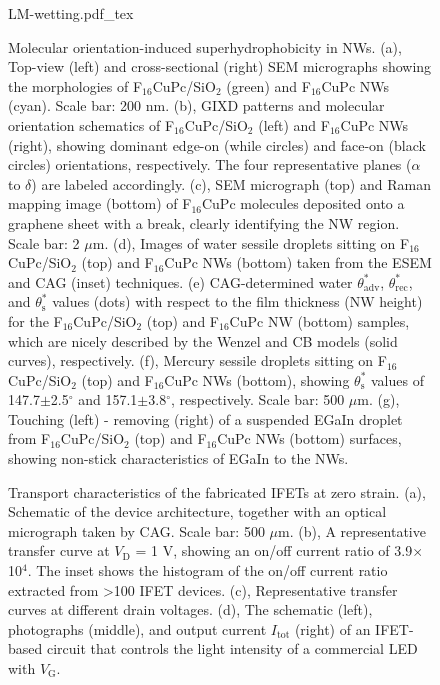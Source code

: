 \begin{figure}[htbp]
  \centering
  {LM-wetting.pdf_tex}
\caption{\label{fig:small-lm-wet} 
Molecular orientation-induced superhydrophobicity in NWs. (a), Top-view (left) and cross-sectional (right) SEM micrographs showing the morphologies of F\(_{\text{16}}\)CuPc/SiO\(_{\text{2}}\) (green) and F\(_{\text{16}}\)CuPc NWs (cyan). Scale bar: 200 nm. (b), GIXD patterns and molecular orientation schematics of F\(_{\text{16}}\)CuPc/SiO\(_{\text{2}}\) (left) and F\(_{\text{16}}\)CuPc NWs (right), showing dominant edge-on (while circles) and face-on (black circles) orientations, respectively. The four representative planes (\(\alpha\) to \(\delta\)) are labeled accordingly. (c), SEM micrograph (top) and Raman mapping image (bottom) of F\(_{\text{16}}\)CuPc molecules deposited onto a graphene sheet with a break, clearly identifying the NW region. Scale bar: 2 \(\mu\)m. (d), Images of water sessile droplets sitting on F\(_{\text{16}}\)CuPc/SiO\(_{\text{2}}\) (top) and F\(_{\text{16}}\)CuPc NWs (bottom) taken from the ESEM and CAG (inset) techniques. (e) CAG-determined water \(\theta_{\mathrm{adv}}^{*}\), \(\theta_{\mathrm{rec}}^{*}\), and \(\theta_{\mathrm{s}}^{*}\) values (dots) with respect to the film thickness (NW height) for the F\(_{\text{16}}\)CuPc/SiO\(_{\text{2}}\) (top) and F\(_{\text{16}}\)CuPc NW (bottom) samples, which are nicely described by the Wenzel and CB models (solid curves), respectively. (f), Mercury sessile droplets sitting on F\(_{\text{16}}\)CuPc/SiO\(_{\text{2}}\) (top) and F\(_{\text{16}}\)CuPc NWs (bottom), showing \(\theta_{\mathrm{s}}^{*}\) values of 147.7\(\pm\)2.5\(^{\circ}\)  and 157.1\(\pm\)3.8\(^{\circ}\), respectively. Scale bar: 500 \(\mu\)m. (g), Touching (left) - removing (right) of a suspended EGaIn droplet from F\(_{\text{16}}\)CuPc/SiO\(_{\text{2}}\) (top) and F\(_{\text{16}}\)CuPc NWs (bottom) surfaces, showing non-stick characteristics of EGaIn to the NWs.}
\end{figure}


\begin{figure}[htbp]
  \centering
\caption{\label{fig:small-main-3}
Transport characteristics of the fabricated IFETs at zero strain. (a), Schematic of the device architecture, together with an optical micrograph taken by CAG. Scale bar: 500 \(\mu\)m. (b), A representative transfer curve at \(V_{\mathrm{D}}\) = 1 V, showing an on/off current ratio of 3.9\(\times{}\)10\(^{\text{4}}\). The inset shows the histogram of the on/off current ratio extracted from \textgreater{}100 IFET devices. (c), Representative transfer curves at different drain voltages. (d), The schematic (left), photographs (middle), and output current \(I_{\mathrm{tot}}\) (right) of an IFET-based circuit that controls the light intensity of a commercial LED with \(V_{\mathrm{G}}\).}
\end{figure}


